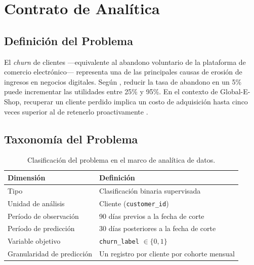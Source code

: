 \documentclass[12pt, letterpaper]{article}
\begin{document}
\tableofcontents
\listoffigures
\listoftables
\newpage

\section{Contrato de Analítica}

\subsection{Definición del Problema}

El \textit{churn} de clientes —equivalente al abandono voluntario de la
plataforma de comercio electrónico— representa una de las principales causas
de erosión de ingresos en negocios digitales. Según \citet{reichheld1990zero},
reducir la tasa de abandono en un 5\% puede incrementar las utilidades entre
25\% y 95\%. En el contexto de Global-E-Shop, recuperar un cliente perdido
implica un costo de adquisición hasta cinco veces superior al de retenerlo
proactivamente \citep{kotler2016marketing}.

\subsection{Taxonomía del Problema}

\begin{table}[H]
\centering
\caption{Clasificación del problema en el marco de analítica de datos.}
\label{tab:taxonomy}
\begin{tabularx}{\textwidth}{lX}
\toprule
\textbf{Dimensión} & \textbf{Definición} \\
\midrule
Tipo & Clasificación binaria supervisada \\
Unidad de análisis & Cliente (\texttt{customer\_id}) \\
Período de observación & 90 días previos a la fecha de corte \\
Período de predicción & 30 días posteriores a la fecha de corte \\
Variable objetivo & \texttt{churn\_label} $\in \{0, 1\}$ \\
Granularidad de predicción & Un registro por cliente por cohorte mensual \\
\bottomrule
\end{tabularx}
\end{table}
\end{document}

